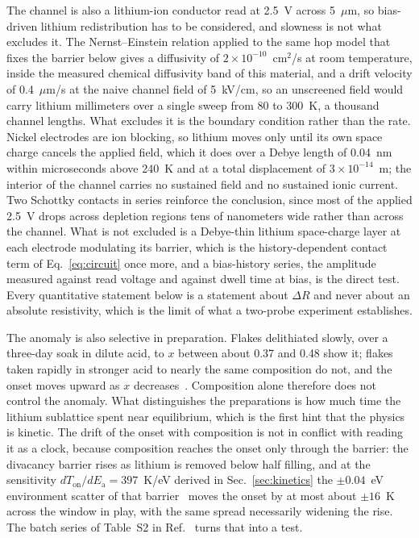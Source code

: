 \documentclass[reprint,twocolumn,prb,amsmath,amssymb,superscriptaddress,floatfix]{revtex4-2}
\newcommand{\Ea}{E_{\mathrm{a}}}
\newcommand{\Ton}{T_{\mathrm{on}}}
\begin{document}
The channel is also a lithium-ion conductor read at 2.5~V across 5~$\mu$m, so bias-driven
lithium redistribution has to be considered, and slowness is not what excludes it. The
Nernst--Einstein relation applied to the same hop model that fixes the barrier below gives a
diffusivity of $2\times10^{-10}$~cm$^{2}$/s at room temperature, inside the measured chemical
diffusivity band of this material, and a drift velocity of 0.4~$\mu$m/s at the naive channel
field of 5~kV/cm, so an unscreened field would carry lithium millimeters over a single sweep
from 80 to 300~K, a thousand channel lengths. What excludes it is the boundary condition rather
than the rate. Nickel electrodes are ion blocking, so lithium moves only until its own space
charge cancels the applied field, which it does over a Debye length of 0.04~nm within
microseconds above 240~K and at a total displacement of $3\times10^{-14}$~m; the interior of the
channel carries no sustained field and no sustained ionic current. Two Schottky contacts in
series reinforce the conclusion, since most of the applied 2.5~V drops across depletion regions
tens of nanometers wide rather than across the channel. What is not excluded is a Debye-thin
lithium space-charge layer at each electrode modulating its barrier, which is the
history-dependent contact term of Eq.~\eqref{eq:circuit} once more, and a bias-history series,
the amplitude measured against read voltage and against dwell time at bias, is the direct test.
Every quantitative statement below is a statement about $\Delta R$ and never about an absolute
resistivity, which is the limit of what a two-probe experiment establishes.

The anomaly is also selective in preparation. Flakes delithiated slowly, over a three-day soak
in dilute acid, to $x$ between about 0.37 and 0.48 show it; flakes taken rapidly in stronger
acid to nearly the same composition do not, and the onset moves upward as $x$
decreases~\cite{RadhaPerspective2021}. Composition alone therefore does not control the anomaly.
What distinguishes the preparations is how much time the lithium sublattice spent near
equilibrium, which is the first hint that the physics is kinetic. The drift of the onset with
composition is not in conflict with reading it as a clock, because composition reaches the onset
only through the barrier: the divacancy barrier rises as lithium is removed below half filling,
and at the sensitivity $d\Ton/d\Ea=397$~K/eV derived in Sec.~\ref{sec:kinetics} the $\pm0.04$~eV
environment scatter of that barrier~\cite{VanderVen2001b} moves the onset by at most about
$\pm16$~K across the window in play, with the same spread necessarily widening the rise.
The batch series of Table~S2 in Ref.~\cite{SM} turns that into a test.
\end{document}
